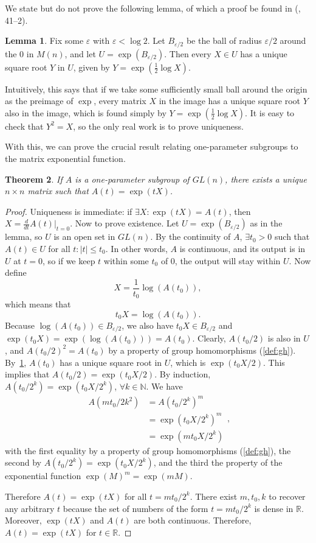 \documentclass[12pt]{article}
\newcommand{\R}{\mathbb{R}}
\newcommand{\N}{\mathbb{N}}
\newtheorem{them}{Theorem}[section]
\theoremstyle{definition}
\theoremstyle{definition}
\theoremstyle{definition}
\newtheorem{lem}[them]{Lemma}
\theoremstyle{definition}
\theoremstyle{definition}
\theoremstyle{definition}
\theoremstyle{definition}
\theoremstyle{definition}
\begin{document}
\par{We state but do not prove the following lemma, of which a proof be found in (\cite{Hall}, 41--2).}
\begin{lem}\label{lem:sqrt} Fix some $\varepsilon$ with
$\varepsilon < \log 2$. Let $B_{\varepsilon / 2}$ be the
ball of radius $\varepsilon / 2$ around the $0$ in
$M(n)$, and let $U = \exp(B_{\varepsilon/2})$. Then
every $X \in U$ has a unique square root $Y$ in
$U$, given by $Y = \exp(\frac{1}{2}\log X)$.
\end{lem}

\par{Intuitively, this says that if we take some
sufficiently small ball around the origin as the preimage of $\exp$,
every matrix $X$ in the image has a unique square
root $Y$ also in the image, which is found
simply by $Y =
\exp(\frac{1}{2}\log X)$. It is easy to check that
$Y^2 = X$, so the only real work is to prove uniqueness.}

\par{With this, we can prove the crucial result relating one-parameter subgroups to the matrix exponential function.}
\begin{them} If $A$ is a one-parameter
subgroup of $GL(n)$, there exists a unique $n
\times n$ matrix such that $A(t) = \exp(tX)$.
\end{them}
\begin{proof} 
\par{Uniqueness is immediate: if
$\exists X: \exp(tX) = A(t)$, then $X =
\frac{d}{dt}A(t)\big|_{t=0}$. Now to prove
existence. Let $U = \exp(B_{\varepsilon / 2})$ as in
the lemma, so $U$ is an open set in $GL(n)$. By
the continuity of $A$, $\exists t_0 > 0$ such that
$A(t) \in U$ for all $t: |t| \leq t_0$. In other
words, $A$ is continuous, and its output is in $U$
at $t=0$, so if we keep $t$ within some $t_0$ of
$0$, the output will stay within $U$. Now define
\[
    X = \frac{1}{t_0}\log(A(t_0)),
\] which means that
\[
    t_0X = \log(A(t_0)).    
\] Because $\log(A(t_0)) \in B_{\varepsilon/2}$, we also have 
$t_0X \in B_{\varepsilon/2}$ and $\exp(t_0X) = \exp(\log(
A(t_0))) = A(t_0)$. Clearly, $A(t_0/2)$ is also in $U$, and
${A(t_0/2)}^2 = A(t_0)$ by a property of group
homomorphisms (\ref{def:gh}). By~\ref{lem:sqrt},
$A(t_0)$ has a unique square root in $U$, which is
$\exp(t_0X/2)$. This implies that $A(t_0/2) =
\exp(t_0X/2)$. By induction, $A(t_0/2^k) =
\exp(t_0X/2^k)$, $\forall k \in \N$. We have
\[\begin{aligned} A(mt_0/2k^2) & = {A(t_0/2^k)}^m \\ & =
{\exp(t_0X/2^k)}^m \\ & = \exp(mt_0X/2^k)
\end{aligned},\]
with the first equality by a property of group
homomorphisms (\ref{def:gh}), the second by
$A(t_0/2^k) = \exp(t_0X/2^k)$, and
the third the
property of the exponential function ${\exp(M)}^m = \exp(mM)$.}
\par{Therefore $A(t) = \exp(tX)$ for all $t =
mt_0/2^k$. 
There exist $m, t_0, k$ to recover any arbitrary
$t$ because the set of numbers of the form $t =
mt_0/2^k$ is dense in $\R$. Moreover,
$\exp(tX)$ and $A(t)$ are both continuous. Therefore,
$A(t) = \exp(tX)$ for $t \in \R$.}
\end{proof}
\end{document}
